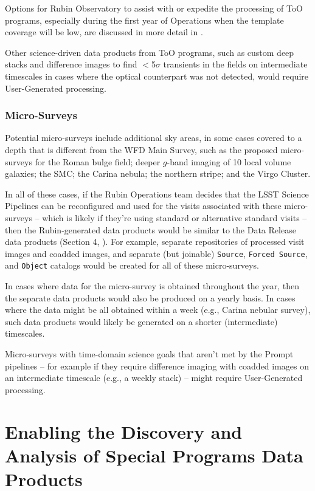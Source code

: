 \documentclass[DM,lsstdoc,toc]{lsstdoc}
\begin{document}
Options for Rubin Observatory to assist with or expedite the processing of ToO programs, especially during the first year of Operations when the template coverage will be low, are discussed in more detail in .

Other science-driven data products from ToO programs, such as custom deep stacks and difference images to find $<$5$\sigma$ transients in the fields on intermediate timescales in cases where the optical counterpart was not detected, would require User-Generated processing.

\subsubsection{Micro-Surveys}

Potential micro-surveys include additional sky areas, in some cases covered to a depth that is different from the WFD Main Survey, such as the proposed micro-surveys for the Roman bulge field; deeper $g$-band imaging of 10 local volume galaxies; the SMC; the Carina nebula; the northern stripe; and the Virgo Cluster.

In all of these cases, if the Rubin Operations team decides that the LSST Science Pipelines can be reconfigured and used for the visits associated with these micro-surveys -- which is likely if they're using standard or alternative standard visits --  then the Rubin-generated data products would be similar to the Data Release data products (Section 4, ).
For example, separate repositories of processed visit images and coadded images, and separate (but joinable) {\tt Source}, {\tt Forced Source}, and {\tt Object} catalogs would be created for all of these micro-surveys.

In cases where data for the micro-survey is obtained throughout the year, then the separate data products would also be produced on a yearly basis.
In cases where the data might be all obtained within a week (e.g., Carina nebular survey), such data products would likely be generated on a shorter (intermediate) timescales. 

Micro-surveys with time-domain science goals that aren't met by the Prompt pipelines -- for example if they require difference imaging with coadded images on an intermediate timescale (e.g., a weekly stack) --  might require User-Generated processing.


\clearpage
\section{Enabling the Discovery and Analysis of Special Programs Data Products}\label{sec:analysis}
\end{document}
